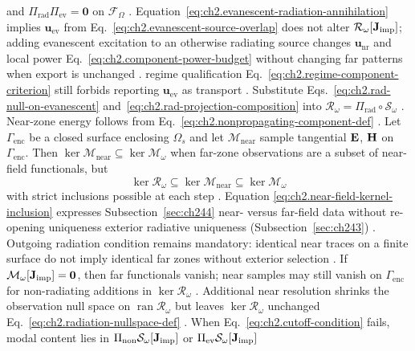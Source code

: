 and \(\Pi_{\mathrm{rad}}\Pi_{\mathrm{ev}}=\mathbf{0}\) on \(\mathcal{F}_\Omega\)
\cite{stratton1941}. Equation~\eqref{eq:ch2.evanescent-radiation-annihilation}
implies \(\mathbf{u}_{\mathrm{ev}}\) from Eq.~\eqref{eq:ch2.evanescent-source-overlap} does
not alter \(\mathcal{R}_\omega[\mathbf{J}_{\mathrm{imp}}]\); adding evanescent excitation to an otherwise
radiating source changes \(\mathbf{u}_{\mathrm{nr}}\) and local power
Eq.~\eqref{eq:ch2.component-power-budget} without changing far patterns when export is
unchanged \cite{stratton1941}. regime qualification Eq.~\eqref{eq:ch2.regime-component-criterion} still
forbids reporting \(\mathbf{u}_{\mathrm{ev}}\) as transport \cite{harrington2001}. Substitute Eqs.~\eqref{eq:ch2.rad-null-on-evanescent} and~\eqref{eq:ch2.rad-projection-composition}
into \(\mathcal{R}_\omega=\Pi_{\mathrm{rad}}\circ\mathcal{S}_\omega\)
\cite{stratton1941}. Near-zone energy follows from
Eq.~\eqref{eq:ch2.nonpropagating-component-def} \cite{harrington2001}.
\label{prop:ch2.near-field-nullity-reduction}
Let \(\Gamma_{\mathrm{enc}}\) be a closed surface enclosing \(\Omega_s\) and let
\(\mathcal{M}_{\mathrm{near}}\) sample tangential \(\mathbf{E}\), \(\mathbf{H}\) on \(\Gamma_{\mathrm{enc}}\).
Then \(\ker\mathcal{M}_{\mathrm{near}}\subseteq\ker\mathcal{M}_\omega\) when far-zone
observations are a subset of near-field functionals, but
\begin{equation}
\label{eq:ch2.near-field-kernel-inclusion}
\ker\mathcal{R}_\omega
\subseteq
\ker\mathcal{M}_{\mathrm{near}}
\subseteq
\ker\mathcal{M}_\omega
\end{equation}
with strict inclusions possible at each step \cite{stratton1941}. Equation
\eqref{eq:ch2.near-field-kernel-inclusion} expresses Subsection~\ref{sec:ch244} near- versus
far-field data without re-opening uniqueness exterior radiative uniqueness (Subsection~\ref{sec:ch243}) \cite{stratton1941}. Outgoing radiation condition remains
mandatory: identical near traces on a finite surface do not imply identical far zones without
exterior selection \cite{harrington2001}.
If \(\mathcal{M}_\omega[\mathbf{J}_{\mathrm{imp}}]=\mathbf{0}\), then far functionals vanish; near samples may
still vanish on \(\Gamma_{\mathrm{enc}}\) for non-radiating additions in
\(\ker\mathcal{R}_\omega\) \cite{stratton1941}. Additional near resolution shrinks the
observation null space on \(\operatorname{ran}\mathcal{R}_\omega\) but leaves \(\ker\mathcal{R}_\omega\) unchanged Eq.~\eqref{eq:ch2.radiation-nullspace-def}
\cite{harrington2001}.
When Eq.~\eqref{eq:ch2.cutoff-condition} fails, modal content lies in
\(\Pi_{\mathrm{non}}\mathcal{S}_\omega[\mathbf{J}_{\mathrm{imp}}]\) or \(\Pi_{\mathrm{ev}}\mathcal{S}_\omega[\mathbf{J}_{\mathrm{imp}}]\)
